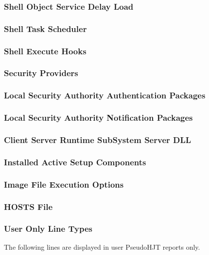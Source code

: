 \subsubsection{Shell Object Service Delay Load}
\subsubsection{Shell Task Scheduler}
\subsubsection{Shell Execute Hooks}
\subsubsection{Security Providers}
\subsubsection{Local Security Authority Authentication Packages}
\subsubsection{Local Security Authority Notification Packages}
\subsubsection{Client Server Runtime SubSystem Server DLL}
\subsubsection{Installed Active Setup Components}
\subsubsection{Image File Execution Options}
\subsubsection{HOSTS File}

\subsubsection{User Only Line Types}
The following lines are displayed in user PseudoHJT reports only.

